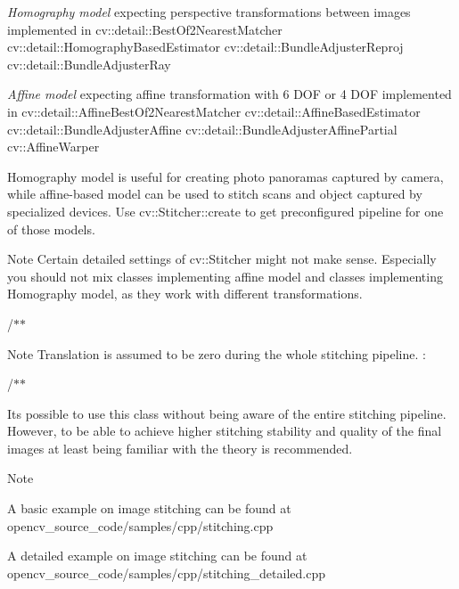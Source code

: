 \begin{DoxyItemize}
\item {\itshape Homography model} expecting perspective transformations between images implemented in cv\+::detail\+::\+Best\+Of2\+Nearest\+Matcher cv\+::detail\+::\+Homography\+Based\+Estimator cv\+::detail\+::\+Bundle\+Adjuster\+Reproj cv\+::detail\+::\+Bundle\+Adjuster\+Ray
\item {\itshape Affine model} expecting affine transformation with 6 D\+OF or 4 D\+OF implemented in cv\+::detail\+::\+Affine\+Best\+Of2\+Nearest\+Matcher cv\+::detail\+::\+Affine\+Based\+Estimator cv\+::detail\+::\+Bundle\+Adjuster\+Affine cv\+::detail\+::\+Bundle\+Adjuster\+Affine\+Partial cv\+::\+Affine\+Warper 
\end{DoxyItemize}

Homography model is useful for creating photo panoramas captured by camera, while affine-\/based model can be used to stitch scans and object captured by specialized devices. Use cv\+::\+Stitcher\+::create to get preconfigured pipeline for one of those models. 

\begin{DoxyNote}{Note}
Certain detailed settings of cv\+::\+Stitcher might not make sense. Especially you should not mix classes implementing affine model and classes implementing Homography model, as they work with different transformations. 
\end{DoxyNote}


/$\ast$$\ast$

\begin{DoxyNote}{Note}
Translation is assumed to be zero during the whole stitching pipeline. \+:
\end{DoxyNote}


/$\ast$$\ast$

It\textquotesingle{}s possible to use this class without being aware of the entire stitching pipeline. However, to be able to achieve higher stitching stability and quality of the final images at least being familiar with the theory is recommended. 

\begin{DoxyNote}{Note}

\begin{DoxyItemize}
\item A basic example on image stitching can be found at opencv\+\_\+source\+\_\+code/samples/cpp/stitching.\+cpp
\begin{DoxyItemize}
\item A detailed example on image stitching can be found at opencv\+\_\+source\+\_\+code/samples/cpp/stitching\+\_\+detailed.\+cpp 
\end{DoxyItemize}
\end{DoxyItemize}
\end{DoxyNote}
